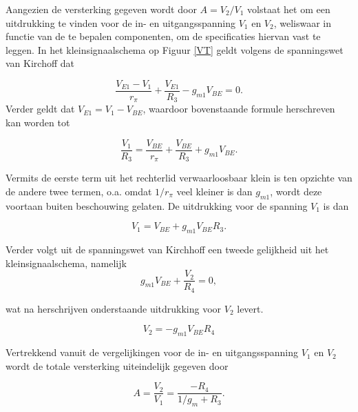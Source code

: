 \documentclass{report}
\begin{document}
Aangezien de versterking gegeven wordt door $A = V_2/V_1$ volstaat het om een uitdrukking te vinden voor de in- en uitgangsspanning $V_1$ en $V_2$, weliswaar in functie van de te bepalen componenten, om de specificaties hiervan vast te leggen. In het kleinsignaalschema op Figuur \ref{VT} geldt volgens de spanningswet van Kirchoff dat

\begin{equation}
    \frac{V_{E1}-V_{1}}{r_{\pi}} + \frac{V_{E1}}{R_{3}} - g_{m1}V_{BE} = 0.
\end{equation}
Verder geldt dat $V_{E1} = V_{1} - V_{BE}$, waardoor bovenstaande formule herschreven kan worden tot

\begin{equation}
    \frac{V_{1}}{R_{3}} = \frac{V_{BE}}{r_{\pi}} + \frac{V_{BE}}{R_{3}} + g_{m1}V_{BE}.
    \label{V1R3}
\end{equation}

Vermits de eerste term uit het rechterlid verwaarloosbaar klein is ten opzichte van de andere twee termen, o.a. omdat $1/r_\pi$ veel kleiner is dan $g_{m1}$, wordt deze voortaan buiten beschouwing gelaten. De uitdrukking voor de spanning $V_1$ is dan

\begin{equation}
    V_1 = V_{BE} + g_{m1}V_{BE}R_3.
    \label{V1}
\end{equation}



Verder volgt uit de spanningswet van Kirchhoff een tweede gelijkheid uit het kleinsignaalschema, namelijk
\begin{equation}
    g_{m1}V_{BE} + \frac{V_{2}}{R_{4}} = 0,
\end{equation}

wat na herschrijven onderstaande uitdrukking voor $V_2$ levert.

\begin{equation}
    V_2 = -g_{m1}V_{BE}R_{4}
\end{equation}

Vertrekkend vanuit de vergelijkingen voor de in- en uitgangsspanning $V_1$ en $V_2$ wordt de totale versterking uiteindelijk gegeven door

\begin{equation}
    A = \frac{V_2}{V_1} =  \frac{-R_{4}}{1/g_m + R_{3}}.
\label{A}
\end{equation}
\end{document}
